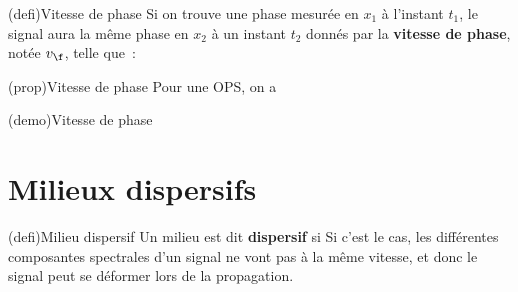 \documentclass[../../main/main.tex]{subfiles}
\begin{document}
\begin{tcb}[sidebyside, sidebyside align=top, righthand ratio=.2](defi){Vitesse de phase}
	Si on trouve une phase mesurée en $x_1$ à l'instant $t_1$, le signal aura la
	même phase en $x_2$ à un instant $t_2$ donnés par la \textbf{vitesse de
		phase}, notée $v_\f$, telle que~:
	\psw{\[\boxed{v_\f = \frac{x_2-x_1}{t_2-t_1}}\]}
	\tcblower
	\psw{%
		\[
			\si{m.s^{-1}}
		\]
	}%
	\vspace{-15pt}
\end{tcb}

\begin{tcb*}(prop){Vitesse de phase}
	Pour une OPS, on a
	\psw{%
		\[
			\boxed{v_{\f} = \frac{\w}{k} = c}
		\]
	}%
	\vspace{-15pt}
\end{tcb*}

\begin{tcb*}(demo){Vitesse de phase}
	\vspace{-15pt}
	\vspace{-10pt}
\end{tcb*}

\section{Milieux dispersifs}

\begin{tcb*}(defi){Milieu dispersif}
	Un milieu est dit \textbf{dispersif} si
	\bigbreak
	Si c'est le cas, les différentes composantes spectrales d'un signal ne vont
	pas à la même vitesse, et donc le signal peut se déformer lors de la
	propagation.
\end{tcb*}
\end{document}
